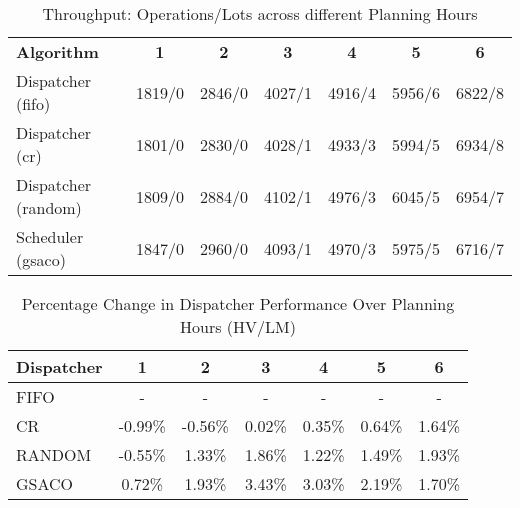 \begin{table}[t]
	\caption{Throughput: Operations/Lots across different Planning Hours} \label{tab:my_label} \centering
	\begin{tabular}{|l|c|c|c|c|c|c|}
		\hline
		\textbf{Algorithm} & \textbf{1} & \textbf{2} & \textbf{3} & \textbf{4} & \textbf{5} & \textbf{6} \\ \cline{1-7} 
		Dispatcher (fifo)   & 1819/0 & 2846/0 & 4027/1 & 4916/4 & 5956/6 & 6822/8 \\
		Dispatcher (cr)     & 1801/0 & 2830/0 & 4028/1 & 4933/3 & 5994/5 & 6934/8 \\
		Dispatcher (random) & 1809/0 & 2884/0 & 4102/1 & 4976/3 & 6045/5 & 6954/7 \\
		Scheduler (gsaco)   & 1847/0 & 2960/0 & 4093/1 & 4970/3 & 5975/5 & 6716/7 \\
		\hline 
	\end{tabular}
\end{table}


\begin{table}[t]
	\caption{Percentage Change in Dispatcher Performance Over Planning Hours (HV/LM)} \label{tab:dispatchers} \centering
	\begin{tabular}{|l|c|c|c|c|c|c|}
		\hline
		\textbf{Dispatcher} & \textbf{1} & \textbf{2} & \textbf{3} & \textbf{4} & \textbf{5} & \textbf{6} \\
		\hline 
		FIFO     & -    & -    & -    & -    & -    & -    \\
		CR       & -0.99\% & -0.56\% & 0.02\% & 0.35\% & 0.64\% & 1.64\% \\
		RANDOM   & -0.55\% & 1.33\% & 1.86\% & 1.22\% & 1.49\% & 1.93\% \\
		GSACO    & 0.72\% & 1.93\% & 3.43\% & 3.03\% & 2.19\% & 1.70\% \\
		\hline
	\end{tabular}
\end{table}

